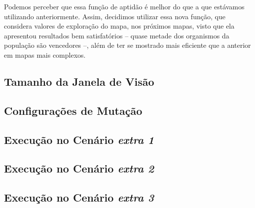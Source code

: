 Podemos perceber que essa função de aptidão é melhor do que a que estávamos
utilizando anteriormente. Assim, decidimos utilizar essa nova função, que
considera valores de exploração do mapa, nos próximos mapas, visto que ela
apresentou resultados bem satisfatórios -- quase metade dos organismos da
população são vencedores --, além de ter se mostrado mais eficiente que a
anterior em mapas mais complexos.

\subsection{\label{section:experiment-vision}Tamanho da Janela de Visão}


\subsection{Configurações de Mutação}


\subsection{Execução no Cenário \textit{extra 1}}


\subsection{Execução no Cenário \textit{extra 2}}


\subsection{Execução no Cenário \textit{extra 3}}

